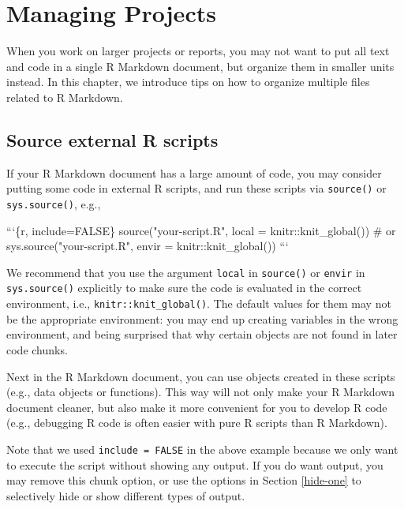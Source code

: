 \documentclass[
  11pt,
]{krantz}
\newenvironment{Shaded}{\begin{snugshade}}{\end{snugshade}}
\newcommand{\BaseNTok}[1]{\textcolor[rgb]{0.06,0.06,0.06}{#1}}
\begin{document}
\hypertarget{managing-projects}{%
\chapter{Managing Projects}\label{managing-projects}}

When you work on larger projects or reports, you may not want to put all text and code in a single R Markdown document, but organize them in smaller units instead. In this chapter, we introduce tips on how to organize multiple files related to R Markdown.

\hypertarget{source-script}{%
\section{Source external R scripts}\label{source-script}}

If your R Markdown document has a large amount of code, you may consider putting some code in external R scripts, and run these scripts via \texttt{source()} or \texttt{sys.source()}, e.g.,

\begin{Shaded}
\begin{Highlighting}[]
\BaseNTok{```\{r, include=FALSE\}}
\BaseNTok{source("your-script.R", local = knitr::knit_global())}
\BaseNTok{# or sys.source("your-script.R", envir = knitr::knit_global())}
\BaseNTok{```}
\end{Highlighting}
\end{Shaded}

We recommend that you use the argument \texttt{local} in \texttt{source()} or \texttt{envir} in \texttt{sys.source()} explicitly to make sure the code is evaluated in the correct environment, i.e., \texttt{knitr::knit\_global()}. The default values for them may not be the appropriate environment: you may end up creating variables in the wrong environment, and being surprised that why certain objects are not found in later code chunks.

Next in the R Markdown document, you can use objects created in these scripts (e.g., data objects or functions). This way will not only make your R Markdown document cleaner, but also make it more convenient for you to develop R code (e.g., debugging R code is often easier with pure R scripts than R Markdown).

Note that we used \texttt{include\ =\ FALSE} in the above example because we only want to execute the script without showing any output. If you do want output, you may remove this chunk option, or use the options in Section \ref{hide-one} to selectively hide or show different types of output.
\end{document}
